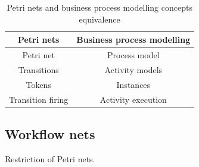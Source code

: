 \begin{table}[H]
    \centering
    \begin{tabular}{c|c}
        \textbf{Petri nets} & \textbf{Business process modelling} \\
        \hline
        Petri net & Process model \\
        Transitions & Activity models \\
        Tokens & Instances \\
        Transition firing & Activity execution \\
    \end{tabular}
    \caption{Petri nets and business process modelling concepts equivalence}
\end{table}


\subsection{Workflow nets}
Restriction of Petri nets.

